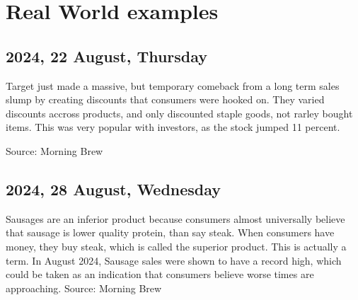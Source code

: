 \documentclass{report}
\begin{document}
\chapter{Real World examples}
\section{2024, 22 August, Thursday}
Target just made a massive, but temporary comeback from a long term sales slump by creating discounts that consumers were hooked on. They varied discounts accross products, and only discounted staple goods, not rarley bought items. This was very popular with investors, as the stock jumped 11 percent. 

Source: Morning Brew
\section{2024, 28 August, Wednesday}
Sausages are an inferior product because consumers almost universally believe that sausage is lower quality protein, than say steak. When consumers have money, they buy steak, which is called the superior product. This is actually a term. In August 2024, Sausage sales were shown to have a record high, which could be taken as an indication that consumers believe worse times are approaching. 
Source: Morning Brew
\end{document}
